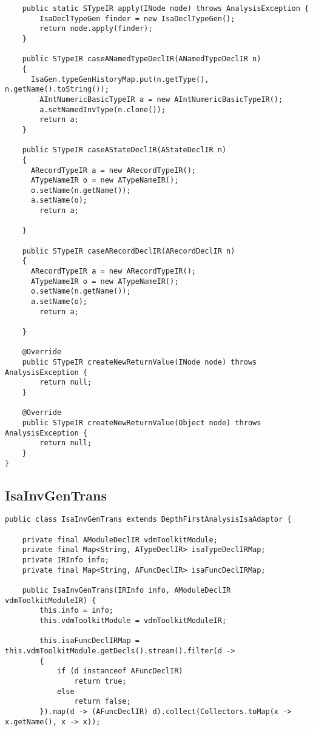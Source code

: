 \begin{appendices}
\begin{lstlisting}
    public static STypeIR apply(INode node) throws AnalysisException {
        IsaDeclTypeGen finder = new IsaDeclTypeGen();
        return node.apply(finder);
    }

    public STypeIR caseANamedTypeDeclIR(ANamedTypeDeclIR n)
    {
      IsaGen.typeGenHistoryMap.put(n.getType(), n.getName().toString());
        AIntNumericBasicTypeIR a = new AIntNumericBasicTypeIR();
        a.setNamedInvType(n.clone());
        return a;
    }

    public STypeIR caseAStateDeclIR(AStateDeclIR n)
    {
      ARecordTypeIR a = new ARecordTypeIR();
      ATypeNameIR o = new ATypeNameIR();
      o.setName(n.getName());
      a.setName(o);
        return a;
      
    }
    
    public STypeIR caseARecordDeclIR(ARecordDeclIR n)
    {
      ARecordTypeIR a = new ARecordTypeIR();
      ATypeNameIR o = new ATypeNameIR();
      o.setName(n.getName());
      a.setName(o);
        return a;
      
    }

    @Override
    public STypeIR createNewReturnValue(INode node) throws AnalysisException {
        return null;
    }

    @Override
    public STypeIR createNewReturnValue(Object node) throws AnalysisException {
        return null;
    }
}
\end{lstlisting}

\subsection{IsaInvGenTrans} \label{IsaInvGenTransafter}
\begin{lstlisting}
public class IsaInvGenTrans extends DepthFirstAnalysisIsaAdaptor {

    private final AModuleDeclIR vdmToolkitModule;
    private final Map<String, ATypeDeclIR> isaTypeDeclIRMap;
    private IRInfo info;
    private final Map<String, AFuncDeclIR> isaFuncDeclIRMap;
    
    public IsaInvGenTrans(IRInfo info, AModuleDeclIR vdmToolkitModuleIR) {
        this.info = info;
        this.vdmToolkitModule = vdmToolkitModuleIR;

        this.isaFuncDeclIRMap = this.vdmToolkitModule.getDecls().stream().filter(d ->
        {
            if (d instanceof AFuncDeclIR)
                return true;
            else
                return false;
        }).map(d -> (AFuncDeclIR) d).collect(Collectors.toMap(x -> x.getName(), x -> x));


\end{lstlisting}
\end{appendices}
